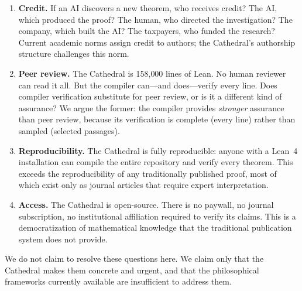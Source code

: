 \begin{enumerate}
  \item \textbf{Credit.} If an AI discovers a new theorem, who
    receives credit? The AI, which produced the proof? The human,
    who directed the investigation? The company, which built the
    AI? The taxpayers, who funded the research? Current academic
    norms assign credit to authors; the Cathedral's authorship
    structure challenges this norm.

  \item \textbf{Peer review.} The Cathedral is 158{,}000 lines of
    Lean. No human reviewer can read it all. But the compiler
    can---and does---verify every line. Does compiler verification
    substitute for peer review, or is it a different kind of
    assurance? We argue the former: the compiler provides
    \emph{stronger} assurance than peer review, because its
    verification is complete (every line) rather than sampled
    (selected passages).

  \item \textbf{Reproducibility.} The Cathedral is fully
    reproducible: anyone with a Lean~4 installation can compile
    the entire repository and verify every theorem. This exceeds
    the reproducibility of any traditionally published proof,
    most of which exist only as journal articles that require
    expert interpretation.

  \item \textbf{Access.} The Cathedral is open-source. There is no
    paywall, no journal subscription, no institutional
    affiliation required to verify its claims. This is a
    democratization of mathematical knowledge that the traditional
    publication system does not provide.
\end{enumerate}

We do not claim to resolve these questions here. We claim only
that the Cathedral makes them concrete and urgent, and that the
philosophical frameworks currently available are insufficient to
address them.
